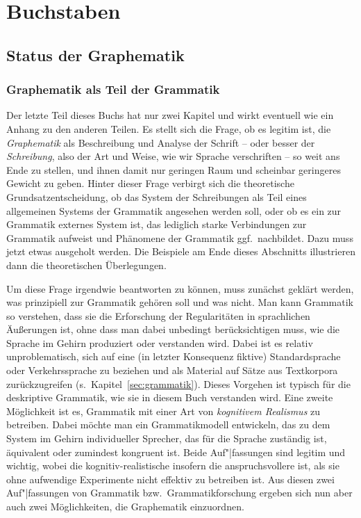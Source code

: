 \chapter{Buchstaben}
\label{sec:buchstaben}

\section{Status der Graphematik}
\label{sec:statusdergraphematik}

\subsection{Graphematik als Teil der Grammatik}
\label{sec:graphematikalsteildergrammatik}

Der letzte Teil dieses Buchs hat nur zwei Kapitel und wirkt eventuell wie ein Anhang zu den anderen Teilen.
Es stellt sich die Frage, ob es legitim ist, die \textit{Graphematik} als Beschreibung und Analyse der Schrift -- oder besser der \textit{Schreibung}, also der Art und Weise, wie wir Sprache verschriften -- so weit ans Ende zu stellen, und ihnen damit nur geringen Raum und scheinbar geringeres Gewicht zu geben.
Hinter dieser Frage verbirgt sich die theoretische Grundsatzentscheidung, ob das System der Schreibungen als Teil eines allgemeinen Systems der Grammatik angesehen werden soll, oder ob es ein zur Grammatik externes System ist, das lediglich starke Verbindungen zur Grammatik aufweist und Phänomene der Grammatik ggf.\ nachbildet.
Dazu muss jetzt etwas ausgeholt werden.
Die Beispiele am Ende dieses Abschnitts illustrieren dann die theoretischen Überlegungen.

Um diese Frage irgendwie beantworten zu können, muss zunächst geklärt werden, was prinzipiell zur Grammatik gehören soll und was nicht.
Man kann Grammatik so verstehen, dass sie die Erforschung der Regularitäten in sprachlichen Äußerungen ist, ohne dass man dabei unbedingt berücksichtigen muss, wie die Sprache im Gehirn produziert oder verstanden wird.
Dabei ist es relativ unproblematisch, sich auf eine (in letzter Konsequenz fiktive) Standardsprache oder Verkehrssprache zu beziehen und als Material auf Sätze aus Textkorpora zurückzugreifen (s.\ Kapitel~\ref{sec:grammatik}).
Dieses Vorgehen ist typisch für die deskriptive Grammatik, wie sie in diesem Buch verstanden wird.
Eine zweite Möglichkeit ist es, Grammatik mit einer Art von \textit{kognitivem Realismus} zu betreiben.
Dabei möchte man ein Grammatikmodell entwickeln, das zu dem System im Gehirn individueller Sprecher, das für die Sprache zuständig ist, äquivalent oder zumindest kongruent ist.
Beide Auf"|fassungen sind legitim und wichtig, wobei die kognitiv-realistische insofern die anspruchsvollere ist, als sie ohne aufwendige Experimente nicht effektiv zu betreiben ist.
Aus diesen zwei Auf"|fassungen von Grammatik bzw.\ Grammatikforschung ergeben sich nun aber auch zwei Möglichkeiten, die Graphematik einzuordnen.

